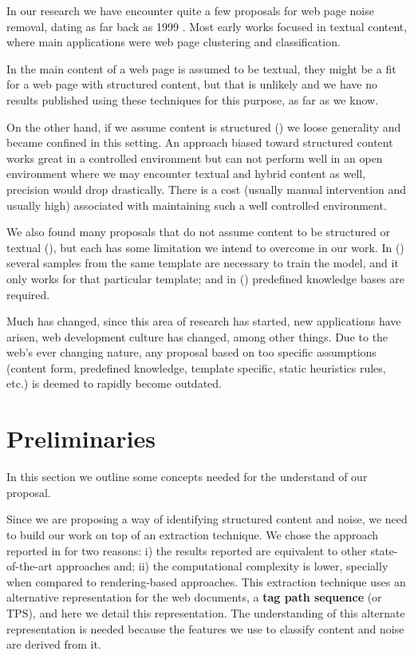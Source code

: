 In our research we have encounter quite a few proposals for web page noise
removal, dating as far back as 1999 \cite{kushmerick1999learning}. Most early
works focused in textual content, where main applications were web page
clustering and classification.

In \cite{Densiometric08,Boilerplate10, vieira2006fast, BlockImp07} the main
content of a web page is assumed to be textual, they might be a fit for a web
page with structured content, but that is unlikely and we have no results
published using these techniques for this purpose, as far as we know.

On the other hand, if we assume content is structured
(\cite{TPS2013,Velloso:2017:ERW:3132847.3132875}) we loose generality and became
confined in this setting. An approach biased toward structured content works
great in a controlled environment but can not perform well in an open
environment where we may encounter textual and hybrid content as well, precision
would drop drastically. There is a cost (usually manual intervention and usually
high) associated with maintaining such a well controlled environment.

We also found many proposals that do not assume content to be structured or
textual (\cite{Noisy03,Jointop07,SiteOriented11,Entropy09}), but each has some
limitation we intend to overcome in our work. In
(\cite{Jointop07,SiteOriented11,Noisy03}) several samples from the same template
are necessary to train the model, and it only works for that particular
template; and in (\cite{Entropy09}) predefined knowledge bases are required.

Much has changed, since this area of research has started, new applications have
arisen, web development culture has changed, among other things. Due to the
web's ever changing nature, any proposal based on too specific assumptions
(content form, predefined knowledge, template specific, static heuristics rules,
etc.) is deemed to rapidly become outdated.

\section{Preliminaries}\label{sec:prelim}
In this section we outline some concepts needed for the understand of our
proposal.

Since we are proposing a way of identifying structured content and noise, we
need to build our work on top of an extraction technique. We chose the approach
reported in \cite{Velloso:2017:ERW:3132847.3132875} for two reasons: i) the
results reported are equivalent to other state-of-the-art approaches and; ii)
the computational complexity is lower, specially when compared to
rendering-based approaches. This extraction technique uses an alternative
representation for the web documents, a \textbf{tag path sequence} (or TPS), and
here we detail this representation. The understanding of this alternate
representation is needed because the features we use to classify content and
noise are derived from it.

